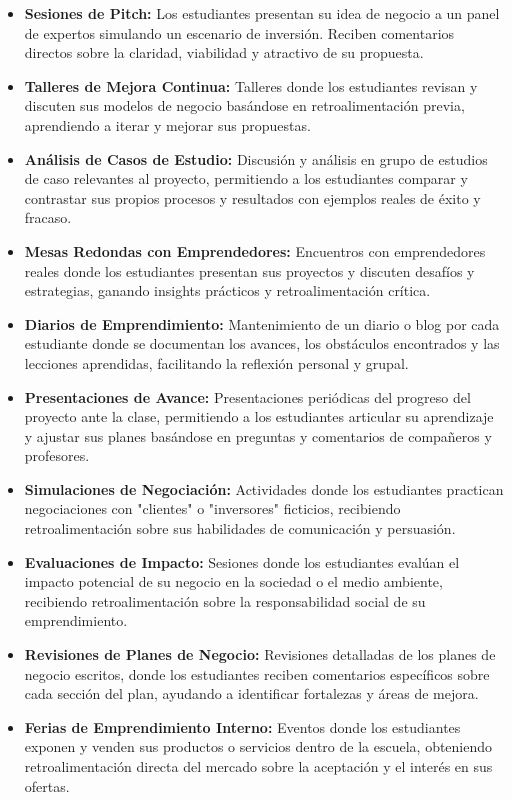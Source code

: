 \begin{itemize}
    \item \textbf{Sesiones de Pitch:} Los estudiantes presentan su idea de negocio a un panel de expertos simulando un escenario de inversión. Reciben comentarios directos sobre la claridad, viabilidad y atractivo de su propuesta.
    \item \textbf{Talleres de Mejora Continua:} Talleres donde los estudiantes revisan y discuten sus modelos de negocio basándose en retroalimentación previa, aprendiendo a iterar y mejorar sus propuestas.
    \item \textbf{Análisis de Casos de Estudio:} Discusión y análisis en grupo de estudios de caso relevantes al proyecto, permitiendo a los estudiantes comparar y contrastar sus propios procesos y resultados con ejemplos reales de éxito y fracaso.
    \item \textbf{Mesas Redondas con Emprendedores:} Encuentros con emprendedores reales donde los estudiantes presentan sus proyectos y discuten desafíos y estrategias, ganando insights prácticos y retroalimentación crítica.
    \item \textbf{Diarios de Emprendimiento:} Mantenimiento de un diario o blog por cada estudiante donde se documentan los avances, los obstáculos encontrados y las lecciones aprendidas, facilitando la reflexión personal y grupal.
    \item \textbf{Presentaciones de Avance:} Presentaciones periódicas del progreso del proyecto ante la clase, permitiendo a los estudiantes articular su aprendizaje y ajustar sus planes basándose en preguntas y comentarios de compañeros y profesores.
    \item \textbf{Simulaciones de Negociación:} Actividades donde los estudiantes practican negociaciones con "clientes" o "inversores" ficticios, recibiendo retroalimentación sobre sus habilidades de comunicación y persuasión.
    \item \textbf{Evaluaciones de Impacto:} Sesiones donde los estudiantes evalúan el impacto potencial de su negocio en la sociedad o el medio ambiente, recibiendo retroalimentación sobre la responsabilidad social de su emprendimiento.
    \item \textbf{Revisiones de Planes de Negocio:} Revisiones detalladas de los planes de negocio escritos, donde los estudiantes reciben comentarios específicos sobre cada sección del plan, ayudando a identificar fortalezas y áreas de mejora.
    \item \textbf{Ferias de Emprendimiento Interno:} Eventos donde los estudiantes exponen y venden sus productos o servicios dentro de la escuela, obteniendo retroalimentación directa del mercado sobre la aceptación y el interés en sus ofertas.
\end{itemize}

